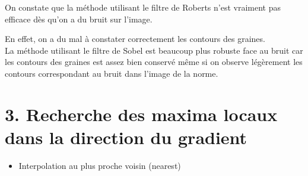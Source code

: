 \documentclass{article}
\begin{document}
On constate que la méthode utilisant le filtre de Roberts n'est vraiment pas efficace dès qu'on a du bruit sur l'image.

En effet, on a du mal à constater correctement les contours des graines.\\

La méthode utilisant le filtre de Sobel est beaucoup plus robuste face au bruit car les contours des graines est assez bien conservé même si on observe légèrement les contours correspondant au bruit dans l'image de la norme.

\section*{3. Recherche des maxima locaux dans la direction du gradient}

\begin{itemize}\renewcommand{\labelitemi}{$\bullet$}
	\item Interpolation au plus proche voisin (nearest)

\begin{center}
	
\end{center}


\end{itemize}
\end{document}
